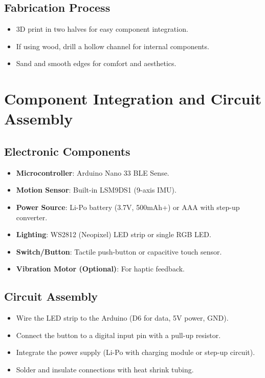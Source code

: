 \subsection{Fabrication Process}
\begin{itemize}
	\item 3D print in two halves for easy component integration.
	\item If using wood, drill a hollow channel for internal components.
	\item Sand and smooth edges for comfort and aesthetics.
\end{itemize}

\section{Component Integration and Circuit Assembly}
\subsection{Electronic Components}
\begin{itemize}
	\item \textbf{Microcontroller}: Arduino Nano 33 BLE Sense.
	\item \textbf{Motion Sensor}: Built-in LSM9DS1 (9-axis IMU).
	\item \textbf{Power Source}: Li-Po battery (3.7V, 500mAh+) or AAA with step-up converter.
	\item \textbf{Lighting}: WS2812 (Neopixel) LED strip or single RGB LED.
	\item \textbf{Switch/Button}: Tactile push-button or capacitive touch sensor.
	\item \textbf{Vibration Motor (Optional)}: For haptic feedback.
\end{itemize}

\subsection{Circuit Assembly}
\begin{itemize}
	\item Wire the LED strip to the Arduino (D6 for data, 5V power, GND).
	\item Connect the button to a digital input pin with a pull-up resistor.
	\item Integrate the power supply (Li-Po with charging module or step-up circuit).
	\item Solder and insulate connections with heat shrink tubing.
\end{itemize}

